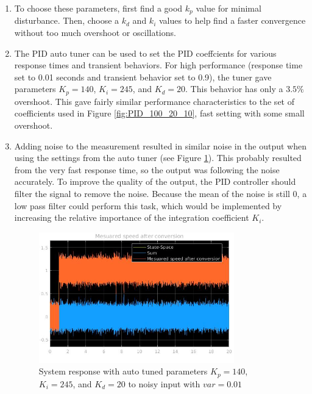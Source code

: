 \documentclass{journal}
\begin{document}
\begin{enumerate}[label=(\alph*)]
	\item %
	To choose these parameters, first find a good $k_p$ value for minimal disturbance.  Then, choose a $k_d$  and $k_i$ values to help find a faster convergence without too much overshoot or oscillations.

	\item %
	The PID auto tuner can be used to set the PID coeffcients for various response times and transient behaviors.  For high performance (response time set to 0.01 seconds and transient behavior set to 0.9), the tuner gave parameters $K_p = 140$, $K_i = 245$, and $K_d = 20$.  This behavior has only a $3.5\%$ overshoot.  This gave fairly similar performance characteristics to the set of coefficients used in Figure \ref{fig:PID_100_20_10}, fast setting with some small overshoot.

	\item %
	Adding noise to the measurement resulted in similar noise in the output when using the settings from the auto tuner (see Figure \ref{fig:Lab1PID_var0.01}).  This probably resulted from the very fast response time, so the output was following the noise accurately.  To improve the quality of the output, the PID controller should filter the signal to remove the noise.  Because the mean of the noise is still 0, a low pass filter could perform this task, which would be implemented by increasing the relative importance of the integration coefficient $K_i$.

	\begin{figure}[H]
		\centering
		\includegraphics[width = 0.8\textwidth]{Lab1PID_0var01.jpg}
		\caption{System response with auto tuned parameters $K_p = 140$, $K_i = 245$, and $K_d = 20$ to noisy input with $var = 0.01$}
		\label{fig:Lab1PID_var0.01}
	\end{figure}


\end{enumerate}
\end{document}
